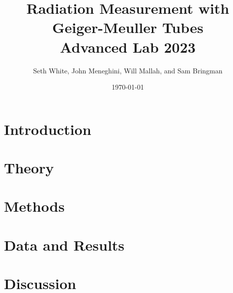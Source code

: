 \documentclass[12pt, letterpaper]{article}
\title{Radiation Measurement with Geiger-Meuller Tubes \\
    \large Advanced Lab 2023}
\author{Seth White, John Meneghini, Will Mallah, and Sam Bringman}
\date{\today}
\begin{document}
    \maketitle

    \begin{abstract}
        
    \end{abstract}

    \section*{Introduction}
    

    \section*{Theory}
    

    \section*{Methods}
    

    \section*{Data and Results}
    

    \section*{Discussion}
    
\end{document}
